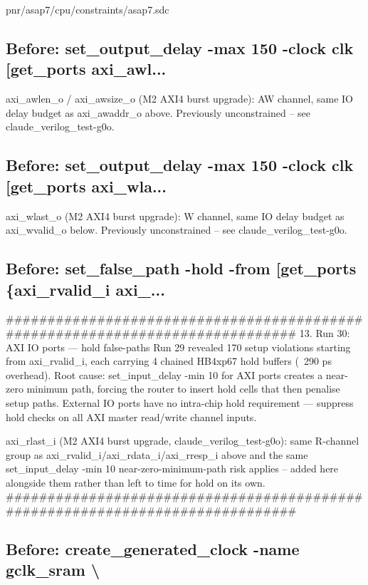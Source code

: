 \begin{relocated}{pnr/asap7/cpu/constraints/asap7.sdc}
\subsection*{Before: set\_output\_delay -max  150 -clock clk [get\_ports axi\_awl...}

\begin{textblock}
axi_awlen_o / axi_awsize_o (M2 AXI4 burst upgrade): AW channel, same IO
delay budget as axi_awaddr_o above. Previously unconstrained -- see
claude_verilog_test-g0o.
\end{textblock}

\subsection*{Before: set\_output\_delay -max  150 -clock clk [get\_ports axi\_wla...}

\begin{textblock}
axi_wlast_o (M2 AXI4 burst upgrade): W channel, same IO delay budget as
axi_wvalid_o below. Previously unconstrained -- see claude_verilog_test-g0o.
\end{textblock}

\subsection*{Before: set\_false\_path -hold -from [get\_ports \{axi\_rvalid\_i axi\_...}

\begin{textblock}
##############################################################################
13. Run 30: AXI IO ports — hold false-paths
Run 29 revealed 170 setup violations starting from axi_rvalid_i, each
carrying 4 chained HB4xp67 hold buffers (~290 ps overhead). Root cause:
set_input_delay -min 10 for AXI ports creates a near-zero minimum path,
forcing the router to insert hold cells that then penalise setup paths.
External IO ports have no intra-chip hold requirement — suppress hold checks
on all AXI master read/write channel inputs.

axi_rlast_i (M2 AXI4 burst upgrade, claude_verilog_test-g0o): same R-channel
group as axi_rvalid_i/axi_rdata_i/axi_rresp_i above and the same
set_input_delay -min 10 near-zero-minimum-path risk applies -- added here
alongside them rather than left to time for hold on its own.
##############################################################################
\end{textblock}

\subsection*{Before: create\_generated\_clock -name gclk\_sram \textbackslash{}}


\end{relocated}
